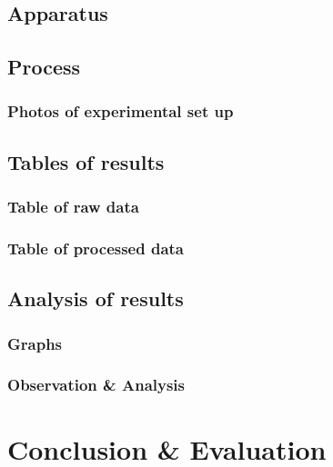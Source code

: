 \documentclass[12pt]{article}
\begin{document}
\begin{flushleft}
            \subsection{Apparatus}
                
            \subsection{Process}
                
                \subsubsection*{Photos of experimental set up}
                    
            \subsection{Tables of results}
                \FloatBarrier  
                \subsubsection*{Table of raw data}
                    
                \subsubsection*{Table of processed data}
                    
            \subsection{Analysis of results}
                \subsubsection*{Graphs}    
                    
                \subsubsection*{Observation \& Analysis}
                    
        \section{Conclusion \& Evaluation}
            
        
        
    \end{flushleft}
\end{document}
